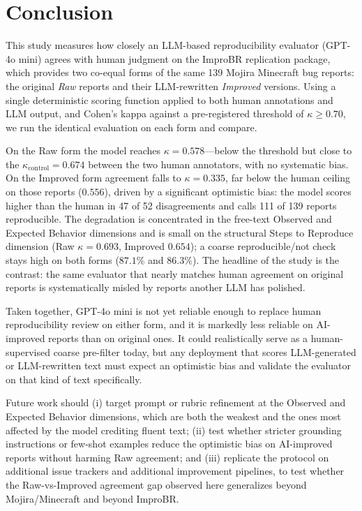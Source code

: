 \section{Conclusion}
\label{sec:conclusion}

This study measures how closely an LLM-based reproducibility evaluator
(GPT-4o mini) agrees with human judgment on the ImproBR replication package,
which provides two co-equal forms of the same 139 Mojira Minecraft bug reports:
the original \emph{Raw} reports and their LLM-rewritten \emph{Improved} versions.
Using a single deterministic scoring function applied to both human annotations
and LLM output, and Cohen's kappa against a pre-registered threshold of
$\kappa \geq 0.70$, we run the identical evaluation on each form and compare.

On the Raw form the model reaches $\kappa = 0.578$---below the threshold but
close to the $\kappa_{\text{control}} = 0.674$ between the two human annotators,
with no systematic bias. On the Improved form agreement falls to
$\kappa = 0.335$, far below the human ceiling on those reports ($0.556$), driven
by a significant optimistic bias: the model scores higher than the human in 47
of 52 disagreements and calls 111 of 139 reports reproducible. The degradation
is concentrated in the free-text Observed and Expected Behavior dimensions and
is small on the structural Steps to Reproduce dimension (Raw $\kappa = 0.693$,
Improved $0.654$); a coarse reproducible/not check stays high on both forms
($87.1\%$ and $86.3\%$). The headline of the study is the contrast: the same
evaluator that nearly matches human agreement on original reports is
systematically misled by reports another LLM has polished.

Taken together, GPT-4o mini is not yet reliable enough to replace human
reproducibility review on either form, and it is markedly less reliable on
AI-improved reports than on original ones. It could realistically serve as a
human-supervised coarse pre-filter today, but any deployment that scores
LLM-generated or LLM-rewritten text must expect an optimistic bias and validate
the evaluator on that kind of text specifically.

Future work should (i) target prompt or rubric refinement at the Observed and
Expected Behavior dimensions, which are both the weakest and the ones most
affected by the model crediting fluent text; (ii) test whether stricter
grounding instructions or few-shot examples reduce the optimistic bias on
AI-improved reports without harming Raw agreement; and (iii) replicate the
protocol on additional issue trackers and additional improvement pipelines, to
test whether the Raw-vs-Improved agreement gap observed here generalizes beyond
Mojira/Minecraft and beyond ImproBR.
